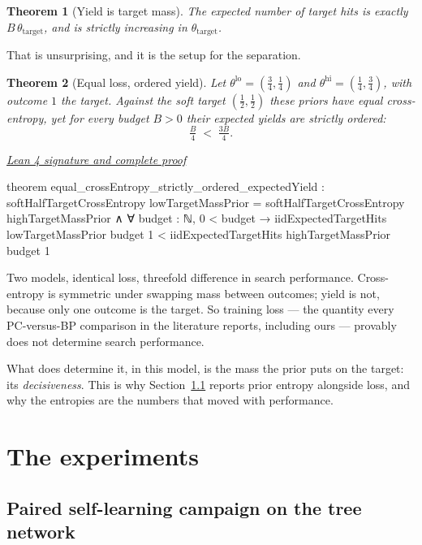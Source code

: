 \documentclass[11pt]{article}
\newtheorem{theorem}{Theorem}[section]
\newcommand{\leancommit}{f3a31db36bb2f944312ee31c1d86c2758109e83a}
\newcommand{\leansignaturelink}[2]{%
  \par\Needspace{0.3\textheight}\smallskip\noindent
  \href{https://github.com/zariuq/MeTTapedia/blob/\leancommit/#1\#L#2}{%
    \scriptsize\itshape Lean 4 signature and complete proof}\par\nobreak}
\begin{document}
\begin{theorem}[Yield is target mass]\label{thm:yield}
The expected number of target hits is exactly $B\,\theta_{\mathrm{target}}$, and is
strictly increasing in $\theta_{\mathrm{target}}$.
\end{theorem}

That is unsurprising, and it is the setup for the separation.

\begin{theorem}[Equal loss, ordered yield]\label{thm:sep}
Let $\theta^{\mathrm{lo}} = (\tfrac34,\tfrac14)$ and
$\theta^{\mathrm{hi}} = (\tfrac14,\tfrac34)$, with outcome $1$ the target. Against the
soft target $(\tfrac12,\tfrac12)$ these priors have \emph{equal} cross-entropy, yet for
every budget $B > 0$ their expected yields are strictly ordered:
\[
\tfrac{B}{4} \;<\; \tfrac{3B}{4}.
\]
\end{theorem}

\leansignaturelink{lean/mettapedia/Mettapedia/MachineLearning/SearchGuidance/%
DecisivenessYield.lean}{242}
\begin{leansignature}
theorem equal_crossEntropy_strictly_ordered_expectedYield :
    softHalfTargetCrossEntropy lowTargetMassPrior =
        softHalfTargetCrossEntropy highTargetMassPrior ∧
      ∀ budget : ℕ, 0 < budget →
        iidExpectedTargetHits lowTargetMassPrior budget 1 <
          iidExpectedTargetHits highTargetMassPrior budget 1
\end{leansignature}

Two models, identical loss, threefold difference in search performance. Cross-entropy is
symmetric under swapping mass between outcomes; yield is not, because only one outcome is
the target. So training loss --- the quantity every PC-versus-BP comparison in the
literature reports, including ours --- provably does not determine search performance.

What does determine it, in this model, is the mass the prior puts on the target: its
\emph{decisiveness}. This is why Section~\ref{sec:tree} reports prior entropy alongside
loss, and why the entropies are the numbers that moved with performance.

\section{The experiments}
\label{sec:experiments}

\subsection{Paired self-learning campaign on the tree network}
\label{sec:tree}
\end{document}
